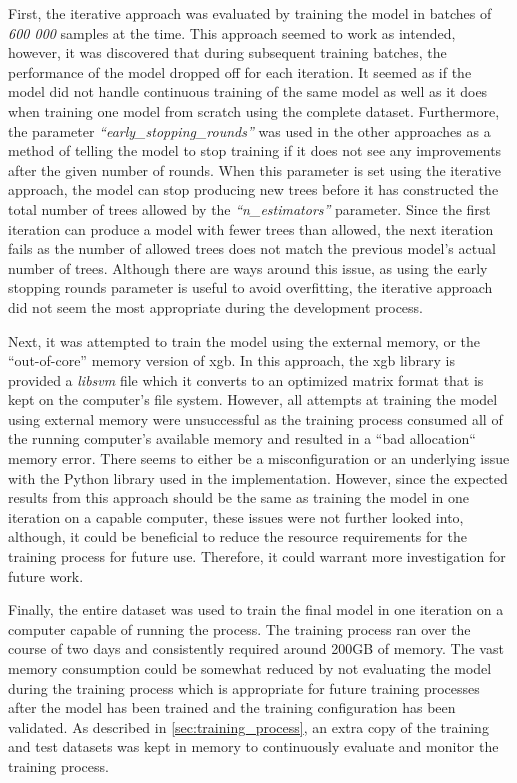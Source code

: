 First, the iterative approach was evaluated by training the model in batches of \textit{600 000} samples at the time. This approach seemed to work as intended, however, it was discovered that during subsequent training batches, the performance of the model dropped off for each iteration. It seemed as if the model did not handle continuous training of the same model as well as it does when training one model from scratch using the complete dataset. Furthermore, the parameter \textit{``early\_stopping\_rounds''} was used in the other approaches as a method of telling the model to stop training if it does not see any improvements after the given number of rounds. When this parameter is set using the iterative approach, the model can stop producing new trees before it has constructed the total number of trees allowed by the \textit{``n\_estimators''} parameter. Since the first iteration can produce a model with fewer trees than allowed, the next iteration fails as the number of allowed trees does not match the previous model's actual number of trees. Although there are ways around this issue, as using the early stopping rounds parameter is useful to avoid overfitting, the iterative approach did not seem the most appropriate during the development process.

Next, it was attempted to train the model using the external memory, or the ``out-of-core'' memory version of \acrshort{xgb}. In this approach, the \acrshort{xgb} library is provided a \textit{libsvm} file which it converts to an optimized matrix format that is kept on the computer's file system. However, all attempts at training the model using external memory were unsuccessful as the training process consumed all of the running computer's available memory and resulted in a ``bad allocation`` memory error. There seems to either be a misconfiguration or an underlying issue with the Python library used in the implementation. However, since the expected results from this approach should be the same as training the model in one iteration on a capable computer, these issues were not further looked into, although, it could be beneficial to reduce the resource requirements for the training process for future use. Therefore, it could warrant more investigation for future work.

Finally, the entire dataset was used to train the final model in one iteration on a computer capable of running the process. The training process ran over the course of two days and consistently required around 200GB of memory. The vast memory consumption could be somewhat reduced by not evaluating the model during the training process which is appropriate for future training processes after the model has been trained and the training configuration has been validated. As described in \cref{sec:training_process}, an extra copy of the training and test datasets was kept in memory to continuously evaluate and monitor the training process.

